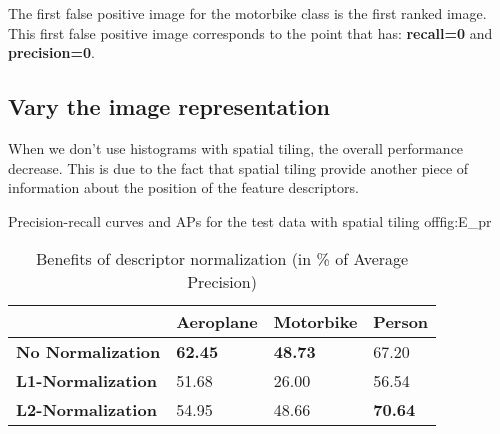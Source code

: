 \documentclass{article}
\begin{document}
The first false positive image for the motorbike class is the first ranked image. This first false positive image corresponds to the point that has: \textbf{recall=0} and \textbf{precision=0}.


\subsection{Vary the image representation}

When we don't use histograms with spatial tiling, the overall performance decrease. This is due to the fact that spatial tiling provide another piece of information about the position of the feature descriptors.

          {}
          {}
          {Precision-recall curves and APs for the test data with spatial tiling off}{fig:E_pr}


\begin{table}[H]
\centering
\begin{tabular}{@{}llll@{}}
\toprule
{\color[HTML]{000000} \textbf{}} & {\color[HTML]{000000} \textbf{Aeroplane}} & {\color[HTML]{000000} \textbf{Motorbike}} & {\color[HTML]{000000} \textbf{Person}} \\ \midrule
\textbf{No Normalization} & \textbf{62.45} & \textbf{48.73} & 67.20 \\
\textbf{L1-Normalization} & 51.68 & 26.00 & 56.54 \\
\textbf{L2-Normalization} & 54.95 & 48.66 & \textbf{70.64} \\ \bottomrule
\end{tabular}
\caption{Benefits of descriptor normalization (in \% of Average Precision)}
\label{my-label}
\end{table}

\end{document}
